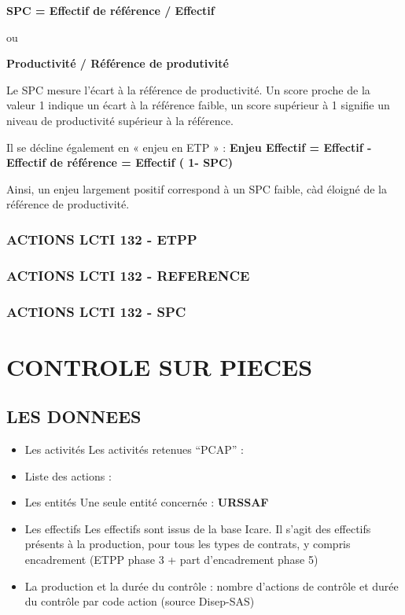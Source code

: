\documentclass[
]{book}
\begin{document}
\textbf{SPC = Effectif de référence / Effectif}

ou

\textbf{Productivité / Référence de produtivité}

Le SPC mesure l'écart à la référence de productivité. Un score proche de la valeur 1 indique un écart à la référence faible, un score supérieur à 1 signifie un niveau de productivité supérieur à la référence.

Il se décline également en « enjeu en ETP » :
\textbf{Enjeu Effectif = Effectif - Effectif de référence = Effectif ( 1- SPC)}

Ainsi, un enjeu largement positif correspond à un SPC faible, càd éloigné de la référence de productivité.

\hypertarget{actions-lcti-132---etpp}{%
\subsection{ACTIONS LCTI 132 - ETPP}\label{actions-lcti-132---etpp}}

\hypertarget{actions-lcti-132---reference}{%
\subsection{ACTIONS LCTI 132 - REFERENCE}\label{actions-lcti-132---reference}}

\hypertarget{actions-lcti-132---spc}{%
\subsection{ACTIONS LCTI 132 - SPC}\label{actions-lcti-132---spc}}

\hypertarget{controle-sur-pieces}{%
\chapter{CONTROLE SUR PIECES}\label{controle-sur-pieces}}

\hypertarget{les-donnees-3}{%
\section{LES DONNEES}\label{les-donnees-3}}

\begin{itemize}
\item
  Les activités
  Les activités retenues ``PCAP'' :
\item
  Liste des actions :
\item
  Les entités
  Une seule entité concernée : \textbf{URSSAF}
\item
  Les effectifs
  Les effectifs sont issus de la base Icare.
  Il s'agit des effectifs présents à la production, pour tous les types de contrats, y compris encadrement (ETPP phase 3 + part d'encadrement phase 5)
\item
  La production et la durée du contrôle : nombre d'actions de contrôle et durée du contrôle par code action (source Disep-SAS)
\end{itemize}
\end{document}
